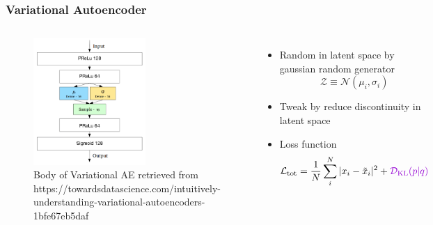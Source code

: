 \documentclass{beamer}
\begin{document}
\begin{frame}
\frametitle{Variational Autoencoder}
\begin{columns}
    \begin{figure}
        \includegraphics[height=0.6\textheight, width=0.6\textwidth]{images/variational_ae}
        \caption{Body of Variational AE \tiny retrieved from https://towardsdatascience.com/intuitively-understanding-variational-autoencoders-1bfe67eb5daf}
    \end{figure}

    \begin{itemize}
        \item Random  in latent space by gaussian random generator
        \begin{equation}
            \mathcal{Z} \equiv \mathcal{N}(\mu_i, \sigma_i)
        \end{equation}
        \item Tweak by \textcolor[RGB]{148,0,211}{reduce discontinuity in latent space}
        \item Loss function
        \begin{equation}
            \mathcal{L}_{\text{tot}} = \frac{1}{N}\sum_i^N |x_i-\tilde{x}_i|^2 + \textcolor[RGB]{148,0,211}{\mathcal{D}_{\text{KL}}(p|q)}
        \end{equation}
    \end{itemize}
\end{columns}
\end{frame}
\end{document}
